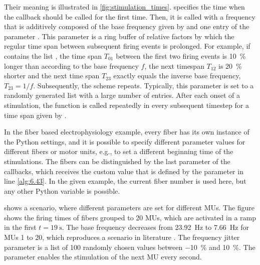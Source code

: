 Their meaning is illustrated in \cref{fig:stimulation_times}.  specifies the time when the callback should be called for the first time. Then, it is called with a frequency that is additively composed of the base frequency given by  and one entry of the parameter . This parameter is a ring buffer of relative factors by which the regular time span between subsequent firing events is prolonged. For example, if  contains the list \code{[0.1,-0.2,0.0]}, the time span $T_{01}$ between the first two firing events is \SI{10}{\percent} longer than according to the base frequency $f$, the next timespan $T_{12}$ is \SI{20}{\percent} shorter and the next time span $T_{23}$ exactly equals the inverse base frequency, $T_{23} = 1/f$. Subsequently, the scheme repeats. Typically, this parameter is set to a randomly generated list with a large number of entries.
After each onset of a stimulation, the  function is called repeatedly in every subsequent timestep for a time span given by . 

In the fiber based electrophysiology example, every fiber has its own instance of the Python settings, and it is possible to specify different parameter values for different fibers or motor units, e.g., to set a different beginning time of the stimulations. The fibers can be distinguished by the last parameter of the callbacks, which receives the custom value that is defined by the  parameter in line \ref{alg:6.43}. In the given example, the current fiber number is used here, but any other Python variable is possible.

 shows a scenario, where different parameters are set for different MUs. The figure shows the firing times of fibers grouped to 20 MUs, which are activated in a ramp in the first $t=\SI{19}{\second}$. The base frequency decreases from \SI{23.92}{\hertz} to \SI{7.66}{\hertz} for MUs 1 to 20, which reproduces a scenario in literature \cite{Klotz2020}. The frequency jitter parameter is a list of 100 randomly chosen values between \SI{-10}{\percent} and \SI[retain-explicit-plus]{+10}{\percent}. The  parameter enables the stimulation of the next MU every second.

